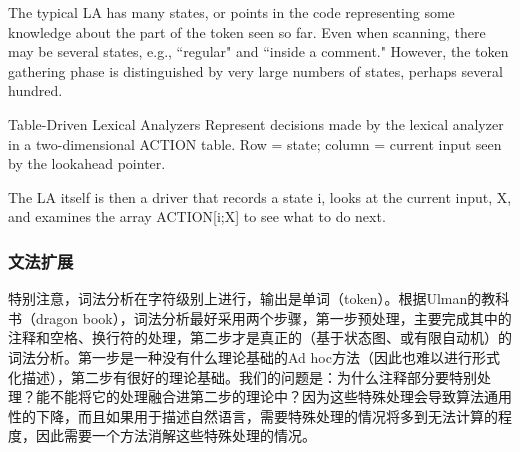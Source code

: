 \documentclass{article}
\begin{document}
\begin{CJK}{UTF8}{gbsn}
The typical LA has many states, or points in the code representing some knowledge about the part of the
token seen so far. Even when scanning, there may be several states, e.g., ``regular" and ``inside a comment." However, the
token gathering phase is distinguished by very large numbers of states, perhaps several hundred.

Table-Driven Lexical Analyzers
Represent decisions made by the lexical analyzer in a two-dimensional ACTION table. Row = state; column = current input seen by the lookahead pointer.

The LA itself is then a driver that records a state i, looks at the current input, X, and examines the array
ACTION[i;X] to see what to do next.

\subsubsection{文法扩展}

特别注意，词法分析在字符级别上进行，输出是单词（token）。根据Ulman的教科书（dragon book），词法分析最好采用两个步骤，第一步预处理，主要完成其中的注释和空格、换行符的处理，第二步才是真正的（基于状态图、或有限自动机）的词法分析。第一步是一种没有什么理论基础的Ad hoc方法（因此也难以进行形式化描述），第二步有很好的理论基础。我们的问题是：为什么注释部分要特别处理？能不能将它的处理融合进第二步的理论中？因为这些特殊处理会导致算法通用性的下降，而且如果用于描述自然语言，需要特殊处理的情况将多到无法计算的程度，因此需要一个方法消解这些特殊处理的情况。


\end{CJK}
\end{document}

